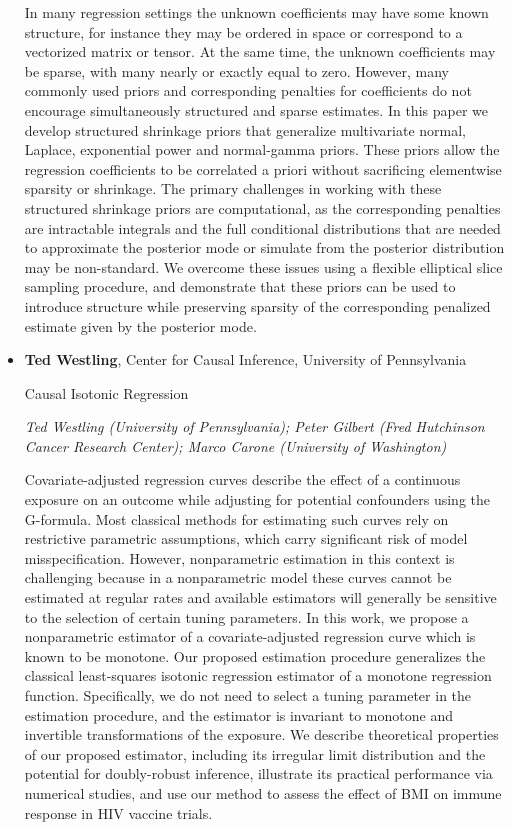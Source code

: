 \begin{itemize}
In many regression settings the unknown coefficients may have some known structure, for instance they may be ordered in space or correspond to a vectorized matrix or tensor. At the same time, the unknown coefficients may be sparse, with many nearly or exactly equal to zero. However, many commonly used priors and corresponding penalties for coefficients do not encourage simultaneously structured and sparse estimates. In this paper we develop structured shrinkage priors that generalize multivariate normal, Laplace, exponential power and normal-gamma priors. These priors allow the regression coefficients to be correlated a priori without sacrificing elementwise sparsity or shrinkage. The primary challenges in working with these  structured shrinkage priors are computational, as the corresponding penalties are intractable integrals and the full conditional distributions that are needed to approximate the posterior mode or simulate from the posterior distribution may be non-standard. We overcome these issues using a flexible elliptical slice sampling procedure, and demonstrate that these priors can be used to introduce structure while preserving sparsity of the corresponding penalized estimate given by the posterior mode.

\item \textbf{Ted Westling}, Center for Causal Inference, University of Pennsylvania

Causal Isotonic Regression

\emph{\footnotesize Ted Westling (University of Pennsylvania); Peter Gilbert (Fred Hutchinson Cancer Research Center); Marco Carone (University of Washington)}

Covariate-adjusted regression curves describe the effect of a continuous exposure on an outcome while adjusting for potential confounders using the G-formula. Most classical methods for estimating such curves rely on restrictive parametric assumptions, which carry significant risk of model misspecification. However, nonparametric estimation in this context is challenging because in a nonparametric model these curves cannot be estimated at regular rates and available estimators will generally be sensitive to the selection of certain tuning parameters. In this work, we propose a nonparametric estimator of a covariate-adjusted regression curve which is known to be monotone. Our proposed estimation procedure generalizes the classical least-squares isotonic regression estimator of a monotone regression function. Specifically, we do not need to select a tuning parameter in the estimation procedure, and the estimator is invariant to monotone and invertible transformations of the exposure. We describe theoretical properties of our proposed estimator, including its irregular limit distribution and the potential for doubly-robust inference, illustrate its practical performance via numerical studies, and use our method to assess the effect of BMI on immune response in HIV vaccine trials.


\end{itemize}
